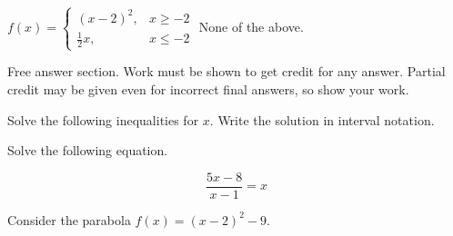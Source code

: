 \begin{questions}
\begin{choices}
    \choice \chooseone $f(x)=\left\{ \begin{matrix}
    	(x-2)^2,& x\ge -2\\
    	\frac{1}{2} x, &x\le- 2
    \end{matrix}\right.$
    \choice \chooseone None of the above.
\end{choices}


	

\newpage
\hspace{-.5in}Free answer section. Work must be shown to get credit for any answer. Partial credit may be given even for incorrect final answers, so show your work.

\question Solve the following inequalities for $x$. Write the solution in interval notation.
\begin{parts}
	\part[5] \[-3\le -4x+5\]
	\vspace{5cm}
	\part[6] \[|3-x|\ge 2\]
	\vspace{6cm}
\end{parts}

\question[6] Solve the following equation.

\[ \dfrac{5x-8}{x-1}=x\]
\newpage

\question %
 Consider the parabola $f(x)=(x-2)^2-9.$
\end{questions}

